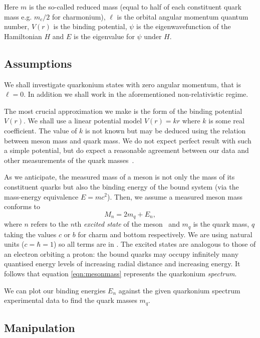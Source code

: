 \documentclass[]{article}
\begin{document}
Here $m$ is the so-called reduced mass (equal to half of each constituent quark mass e.g. $m_{c}/2$ for charmonium), $\ell$ is the orbital angular momentum quantum number, $V(r)$ is the binding potential, $\psi$ is the eigenwavefunction of the Hamiltonian $H$ and $E$ is the eigenvalue for $\psi$ under $H$.

\subsection{Assumptions}\label{ssec:assumptions}

We shall investigate quarkonium states with zero angular momentum, that is $\ell = 0$. In addition we shall work in the aforementioned non-relativistic regime.

The most crucial approximation we make is the form of the binding potential $V(r)$. We shall use a linear potential model $V(r) = kr$ where $k$ is some real coefficient. The value of $k$ is not known but may be deduced using the relation between meson mass and quark mass. We do not expect perfect result with such a simple potential, but do expect a reasonable agreement between our data and other measurements of the quark masses~\cite{ref:pdg}.

As we anticipate, the measured mass of a meson is not only the mass of its constituent quarks but also the binding energy of the bound system (via the mass-energy equivalence $E=mc^{2}$). Then, we assume a measured meson mass conforms to
\begin{equation}\label{eqn:mesonmass}
M_{n} = 2m_{q} + E_{n},
\end{equation}
where $n$ refers to the $n$th \emph{excited state} of the meson~\cite{ref:buchmuller} and $m_{q}$ is the quark mass, $q$ taking the values $c$ or $b$ for charm and bottom respectively. We are using natural units ($c = \hbar = 1$) so all terms are in \GeV. The excited states are analogous to those of an electron orbiting a proton: the bound quarks may occupy infinitely many quantised energy levels of increasing radial distance and increasing energy. It follows that equation \ref{eqn:mesonmass} represents the quarkonium \emph{spectrum}.

We can plot our binding energies $E_{n}$ against the given quarkonium spectrum experimental data to find the quark masses $m_{q}$.

\subsection{Manipulation}
\end{document}
